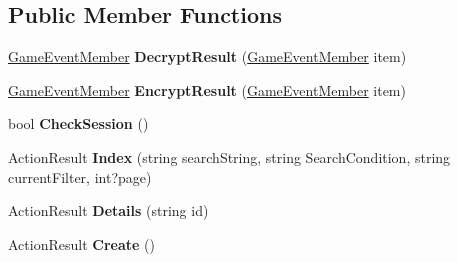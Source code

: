 \subsection*{Public Member Functions}
\begin{DoxyCompactItemize}
\item 
\hyperlink{class_cloud_bread_admin_web_1_1_game_event_member}{Game\+Event\+Member} {\bfseries Decrypt\+Result} (\hyperlink{class_cloud_bread_admin_web_1_1_game_event_member}{Game\+Event\+Member} item)\hypertarget{class_cloud_bread_admin_web_1_1_controllers_1_1_game_event_members_controller_a16c0d6166a6c7e117e33552c6554b788}{}\label{class_cloud_bread_admin_web_1_1_controllers_1_1_game_event_members_controller_a16c0d6166a6c7e117e33552c6554b788}

\item 
\hyperlink{class_cloud_bread_admin_web_1_1_game_event_member}{Game\+Event\+Member} {\bfseries Encrypt\+Result} (\hyperlink{class_cloud_bread_admin_web_1_1_game_event_member}{Game\+Event\+Member} item)\hypertarget{class_cloud_bread_admin_web_1_1_controllers_1_1_game_event_members_controller_afca8ee60999f64ce5fb252d94188d96a}{}\label{class_cloud_bread_admin_web_1_1_controllers_1_1_game_event_members_controller_afca8ee60999f64ce5fb252d94188d96a}

\item 
bool {\bfseries Check\+Session} ()\hypertarget{class_cloud_bread_admin_web_1_1_controllers_1_1_game_event_members_controller_ae11b363756e47919d98bbb7270237637}{}\label{class_cloud_bread_admin_web_1_1_controllers_1_1_game_event_members_controller_ae11b363756e47919d98bbb7270237637}

\item 
Action\+Result {\bfseries Index} (string search\+String, string Search\+Condition, string current\+Filter, int?page)\hypertarget{class_cloud_bread_admin_web_1_1_controllers_1_1_game_event_members_controller_a25beb95f29cc0ae69ab4608d71947a0f}{}\label{class_cloud_bread_admin_web_1_1_controllers_1_1_game_event_members_controller_a25beb95f29cc0ae69ab4608d71947a0f}

\item 
Action\+Result {\bfseries Details} (string id)\hypertarget{class_cloud_bread_admin_web_1_1_controllers_1_1_game_event_members_controller_a3a566d0635dfd0094040629688d4ed87}{}\label{class_cloud_bread_admin_web_1_1_controllers_1_1_game_event_members_controller_a3a566d0635dfd0094040629688d4ed87}

\item 
Action\+Result {\bfseries Create} ()\hypertarget{class_cloud_bread_admin_web_1_1_controllers_1_1_game_event_members_controller_aaceedfa2ec280ae1a750661d391a7d41}{}\label{class_cloud_bread_admin_web_1_1_controllers_1_1_game_event_members_controller_aaceedfa2ec280ae1a750661d391a7d41}


\end{DoxyCompactItemize}
